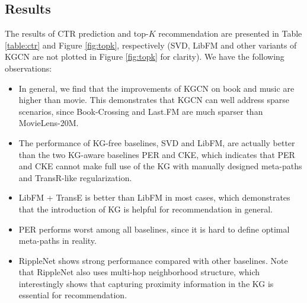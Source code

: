 \documentclass[sigconf]{acmart}
\begin{document}
	\subsection{Results}
		The results of CTR prediction and top-$K$ recommendation are presented in Table \ref{table:ctr} and Figure \ref{fig:topk}, respectively (SVD, LibFM and other variants of KGCN are not plotted in Figure \ref{fig:topk} for clarity).
        We have the following observations:
        \begin{itemize}
        	\item
        		In general, we find that the improvements of KGCN on book and music are higher than movie.
        		This demonstrates that KGCN can well address sparse scenarios, since Book-Crossing and Last.FM are much sparser than MovieLens-20M.
        	\item
        		The performance of KG-free baselines, SVD and LibFM, are actually better than the two KG-aware baselines PER and CKE, which indicates that PER and CKE cannot make full use of the KG with manually designed meta-paths and TransR-like regularization.
        	\item
        		LibFM + TransE is better than LibFM in most cases, which demonstrates that the introduction of KG is helpful for recommendation in general.
        	\item
        		PER performs worst among all baselines, since it is hard to define optimal meta-paths in reality.
        	\item
        		RippleNet shows strong performance compared with other baselines.
        		Note that RippleNet also uses multi-hop neighborhood structure, which interestingly shows that capturing proximity information in the KG is essential for recommendation.
        \end{itemize}
        
\end{document}
